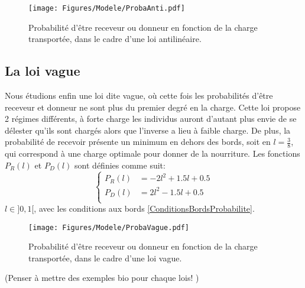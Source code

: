 \begin{figure}[h]
\centering
\texttt{[image: Figures/Modele/ProbaAnti.pdf]}
\caption{Probabilité d'être receveur ou donneur en fonction de la charge transportée, dans le cadre d'une loi antilinéaire.}
\label{ProbaAnti}
\end{figure}

\subsection{La loi vague}
Nous étudions enfin une loi dite vague, où cette fois les probabilités d'être receveur et donneur ne sont plus du premier degré en la charge. Cette loi propose 2 régimes différents, à forte charge les individus auront d'autant plus envie de se délester qu'ils sont chargés alors que l'inverse a lieu à faible charge. De plus, la probabilité de recevoir présente un minimum en dehors des bords, soit en $l=\frac{3}{8}$, qui correspond à une charge optimale pour donner de la nourriture. Les fonctions $P_R(l)$ et $P_D(l)$ sont définies comme suit:
\begin{equation}
\left \{
\begin{aligned}
P_R (l) &= -2l^2+1.5l+0.5\\
P_D (l) &= 2l^2-1.5l+0.5\\
\end{aligned}
\right.
\label{PRVague}
\end{equation}
$l\in]0,1[$, avec les conditions aux bords \ref{ConditionsBordsProbabilite}.

\begin{figure}[h]
\centering
\texttt{[image: Figures/Modele/ProbaVague.pdf]}
\caption{Probabilité d'être receveur ou donneur en fonction de la charge transportée, dans le cadre d'une loi vague.}
\label{ProbaVague}
\end{figure}

(Penser à mettre des exemples bio pour chaque lois! \fixme)